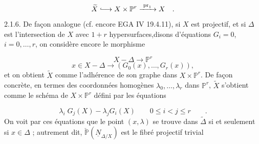 \begin{equation*}
\widetilde{X} \lhook\joinrel\longrightarrow X \times \mathbb{P}^r \xrightarrow{\ \mathrm{pr}_1\ } X \quad .
\end{equation*}
2.1.6. De façon analogue (cf. encore EGA IV 19.4.11), si $X$ est projectif, et si $\Delta$ est l'intersection de $X$ avec $1 + r$ hypersurfaces,disons d'équations $G_i = 0$, $i = 0,\ldots,r$, on considère encore le morphisme

\begin{equation*}
X - \Delta \longrightarrow \mathbb{P}^r
\end{equation*}
\begin{equation*}
x \in X- \Delta \longrightarrow (G_0(x),\ldots,G_r(x)),
\end{equation*}
et on obtient $\widetilde{X}$ comme l'adhérence de son graphe dans $X \times \mathbb{P}^r$. De façon
concrète, en termes des coordonnées homogènes $\lambda_0,\ldots,\lambda_r$ dans $\mathbb{P}^r$, $\widetilde{X}$ s'obtient comme le schéma de $X \times \mathbb{P}^r$ défini par les équations

\begin{equation}\tag{2.1.6.1}
\lambda_i \; G_j(X) - \lambda_j G_i(X) \qquad 0 \leq i < j \leq r \qquad .
\end{equation}
On voit par ces équations que le point $(x,\lambda)$ se trouve dans $\widetilde{\Delta}$ si et seulement si $x \in \Delta$ ; autrement dit, $\check{\mathbb{P}} (\underline{N}_{\Delta/X})$ est le fibré projectif trivial

